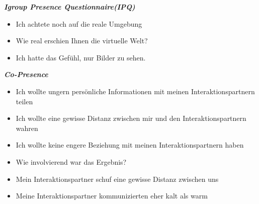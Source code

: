 \documentclass[a4paper,11pt]{article}%
\renewcommand{\\}{\vspace*{0.5\baselineskip} \newline}
\begin{document}
\textbf{\textit{Igroup Presence Questionnaire(IPQ)}}
\begin{itemize}
	\item Ich achtete noch auf die reale Umgebung
	\item Wie real erschien Ihnen die virtuelle Welt?
	\item Ich hatte das Gefühl, nur Bilder zu sehen. 
\end{itemize}

\textbf{\textit{Co-Presence}}
\begin{itemize}
	\item Ich wollte ungern persönliche Informationen mit meinen Interaktionspartnern teilen
	\item Ich wollte eine gewisse Distanz zwischen mir und den Interaktionspartnern wahren
	\item Ich wollte keine engere Beziehung mit meinen Interaktionspartnern haben
	\item Wie involvierend war das Ergebnis?
	\item Mein Interaktionspartner schuf eine gewisse Distanz zwischen uns
	\item Meine Interaktionspartner kommunizierten eher \dq{}kalt\dq{} als \dq{}warm \dq{}
\end{itemize}
\end{document}
